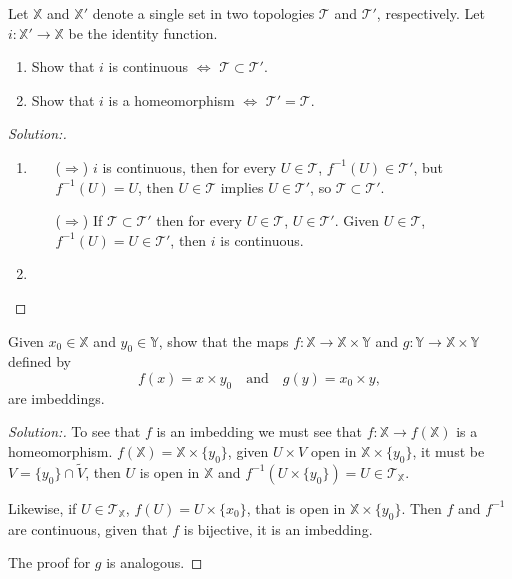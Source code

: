 \documentclass[a4paper,12pt, reqno]{article}
\theoremstyle{definition}
\newenvironment{exerr}[1]{
  \renewcommand\theexeralt{#1}
  \exeralt
}{\endexeralt}
\newenvironment{solution}{\begin{proof}[Solution:]}{\end{proof}}
\newcommand{\T}{\mathscr{T}}
\newcommand{\X}{\mathbb{X}}
\newcommand{\Y}{\mathbb{Y}}
\begin{document}
\begin{exerr}{3}
  Let $\X$ and $\X'$ denote a single set in two topologies $\T$ and $\T'$, respectively. Let $i:\X'\to\X$ be the identity function.
  \begin{enumerate}[label= (\alph*)]
    \item Show that $i$ is continuous $\Longleftrightarrow$ $\T\subset\T'$.
    \item Show that $i$ is a homeomorphism $\iff$ $\T' = \T$.
  \end{enumerate}
\end{exerr}
\begin{solution}\hfill
  \begin{enumerate}[label= (\alph*)]
    \item \hfill
          \begin{itemize}
            \item[($\Longrightarrow$)] $i$ is continuous, then for every $U\in\T$, $f^{-1}(U)\in\T'$, but $f^{-1}(U) = U$, then $U\in\T$ implies $U\in\T'$, so $\T\subset\T'$.
            \item[($\Longrightarrow$)] If $\T\subset\T'$ then for every $U\in\T$, $U\in\T'$. Given $U\in\T$, $f^{-1}(U) = U\in\T'$, then $i$ is continuous.
          \end{itemize}
    \item
  \end{enumerate}
\end{solution}

\begin{exerr}{4}
  Given $x_{0}\in\X$ and $y_{0}\in\Y$, show that the maps $f:\X\to\X\times\Y$ and $g:\Y\to\X\times\Y$ defined by
  \begin{equation*}
    f(x) = x\times y_{0}\quad \text{and}\quad g(y) = x_{0}\times y,
  \end{equation*}
  are imbeddings.
\end{exerr}
\begin{solution}
  To see that $f$ is an imbedding we must see that $f:\X\to f(\X)$ is a homeomorphism. $f(\X) = \X\times\{ y_{0 } \}$, given $U\times V$ open in $\X\times\{ y_{0} \}$, it must be $V = \{ y_{0} \}\cap \widetilde{V}$, then $U$ is open in $\X$ and $f^{-1}(U\times\{ y_{0} \}) = U\in\T_{\X}$.

  Likewise, if $U\in\T_{\X}$, $f(U) = U\times\{ x_{0} \}$, that is open in $\X\times\{ y_{0} \}$. Then $f$ and $f^{-1}$ are continuous, given that $f$ is bijective, it is an imbedding.

  The proof for $g$ is analogous.
\end{solution}
\end{document}
